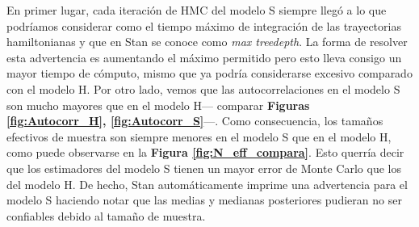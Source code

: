  En primer lugar, cada iteración de HMC del modelo S siempre llegó a lo que podríamos considerar como el tiempo máximo de integración de las trayectorias hamiltonianas y que en Stan se conoce como \textit{max treedepth}. La forma de resolver esta advertencia es aumentando el máximo permitido pero esto lleva consigo un mayor tiempo de cómputo, mismo que ya podría considerarse excesivo comparado con el modelo H. Por otro lado, vemos que las autocorrelaciones en el modelo S son mucho mayores que en el modelo H--- comparar \textbf{Figuras  \ref{fig:Autocorr_H}, \ref{fig:Autocorr_S}}---. Como consecuencia, los tamaños efectivos de muestra son siempre menores en el modelo S que en el modelo H, como puede observarse en la \textbf{Figura \ref{fig:N_eff_compara}}. Esto querría decir que los estimadores del modelo S tienen un mayor error de Monte Carlo que los del modelo H. De hecho, Stan automáticamente imprime una advertencia para el modelo S haciendo notar que las medias y medianas posteriores pudieran no ser confiables debido al tamaño de muestra.\\
 
